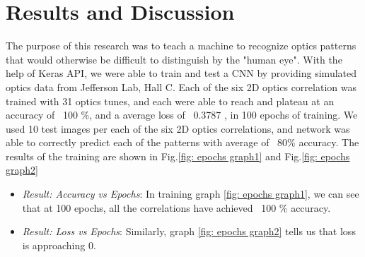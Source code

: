 \documentclass[conference]{IEEEtran}
\begin{document}
\section{Results and Discussion}
\indent The purpose of this research was to teach a machine to recognize optics patterns that would otherwise be
difficult to distinguish by the "human eye". With the help of Keras API, we were able to train and test a CNN
by providing simulated optics data from Jefferson Lab, Hall C.  Each of the six 2D optics correlation was trained with
31 optics tunes, and each were able to reach and plateau at an accuracy of ~100 \%, and a average loss of ~0.3787 , in 100 epochs of training.
We used 10 test images per each of the six 2D optics correlations, and network was able to correctly predict each of the patterns with average of ~80\% accuracy. The results of the training are shown in Fig.\ref{fig: epochs graph1} and Fig.\ref{fig: epochs graph2}

\begin{itemize}
\item \emph{Result: Accuracy vs Epochs}: In training graph \ref{fig: epochs graph1}, we can see that at 100 epochs, all the correlations have achieved ~100 \% accuracy.
\item \emph{Result: Loss vs Epochs}: Similarly, graph \ref{fig: epochs graph2} tells us that loss is approaching $0$.
\end{itemize}
\end{document}
